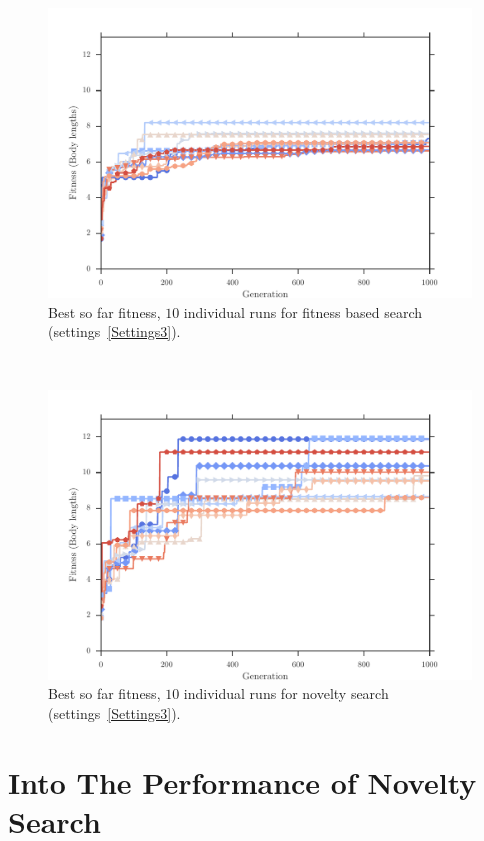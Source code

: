 \begin{figure}[ht!]
\centering
\includegraphics[width=1.0\textwidth]{../Figures/Results/indRunnAvgSize7Fitness.pdf}
\caption{Best so far fitness, $10$ individual runs for fitness based search (settings~\ref{Settings3}).}
\label{fig:indRunsAvgSize10Fitness}
\end{figure}
~
\begin{figure}[ht!]
\centering
\includegraphics[width=1.0\textwidth]{../Figures/Results/indRunnAvgSize7Novelty.pdf}
\caption{Best so far fitness, $10$ individual runs for novelty search (settings~\ref{Settings3}).}
\label{fig:indRunnAvgSize10Novelty}
\end{figure}


\section{Into The Performance of Novelty Search}

